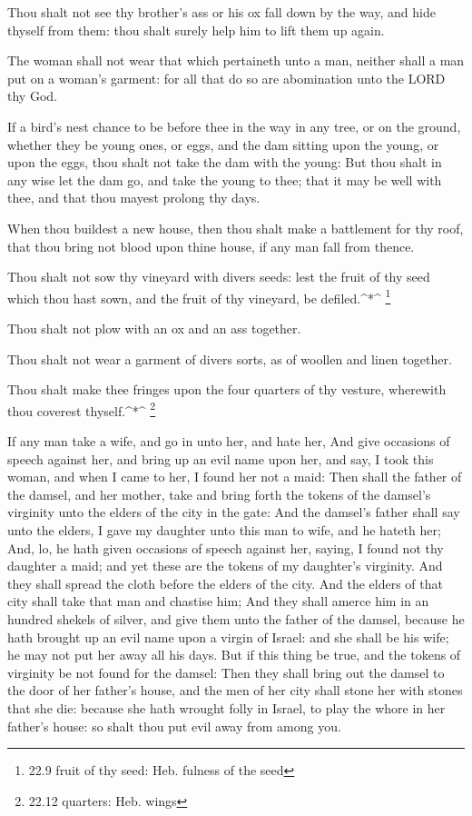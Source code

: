 Thou shalt not see thy brother's ass or his ox fall down by
the way, and hide thyself from them: thou shalt surely help him to lift
them up again.

 The woman shall not wear that which pertaineth unto a man,
neither shall a man put on a woman's garment: for all that do so are
abomination unto the LORD thy God.

 If a bird's nest chance to be before thee in the way in any
tree, or on the ground, whether they be young ones, or eggs, and the dam
sitting upon the young, or upon the eggs, thou shalt not take the dam
with the young:  But thou shalt in any wise let the dam go,
and take the young to thee; that it may be well with thee, and that thou
mayest prolong thy days.

 When thou buildest a new house, then thou shalt make a
battlement for thy roof, that thou bring not blood upon thine house, if
any man fall from thence.

 Thou shalt not sow thy vineyard with divers seeds: lest the
fruit of thy seed which thou hast sown, and the fruit of thy vineyard,
be defiled.\^{}*\^{} \footnote{22.9 fruit of thy seed: Heb. fulness of
  the seed}

 Thou shalt not plow with an ox and an ass together.

 Thou shalt not wear a garment of divers sorts, as of
woollen and linen together.

 Thou shalt make thee fringes upon the four quarters of thy
vesture, wherewith thou coverest thyself.\^{}*\^{} \footnote{22.12
  quarters: Heb. wings}

 If any man take a wife, and go in unto her, and hate her,
 And give occasions of speech against her, and bring up an
evil name upon her, and say, I took this woman, and when I came to her,
I found her not a maid:  Then shall the father of the
damsel, and her mother, take and bring forth the tokens of the damsel's
virginity unto the elders of the city in the gate:  And the
damsel's father shall say unto the elders, I gave my daughter unto this
man to wife, and he hateth her;  And, lo, he hath given
occasions of speech against her, saying, I found not thy daughter a
maid; and yet these are the tokens of my daughter's virginity. And they
shall spread the cloth before the elders of the city.  And
the elders of that city shall take that man and chastise him;
 And they shall amerce him in an hundred shekels of silver,
and give them unto the father of the damsel, because he hath brought up
an evil name upon a virgin of Israel: and she shall be his wife; he may
not put her away all his days.  But if this thing be true,
and the tokens of virginity be not found for the damsel: 
Then they shall bring out the damsel to the door of her father's house,
and the men of her city shall stone her with stones that she die:
because she hath wrought folly in Israel, to play the whore in her
father's house: so shalt thou put evil away from among you.


